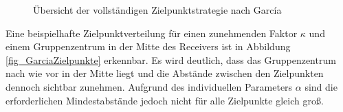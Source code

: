 \begin{figure}[p]
    \centering
\setlength{\fboxsep}{3pt}
    \setlength{\fboxrule}{1pt}
    \caption[Übersicht der vollständigen Zielpunktstrategie nach García]{Übersicht der vollständigen Zielpunktstrategie nach García \cite[S.10]{Garcia2}}
    \label{fig_GarciaAlg}
\end{figure}

Eine beispielhafte Zielpunktverteilung für einen zunehmenden Faktor $\kappa$ und einem Gruppenzentrum in der Mitte des Receivers ist in Abbildung \ref{fig_GarciaZielpunkte} erkennbar.
Es wird deutlich, dass das Gruppenzentrum nach wie vor in der Mitte liegt und die Abstände zwischen den Zielpunkten dennoch sichtbar zunehmen.
Aufgrund des individuellen Parameters $\alpha$ sind die erforderlichen Mindestabstände jedoch nicht für alle Zielpunkte gleich groß.

